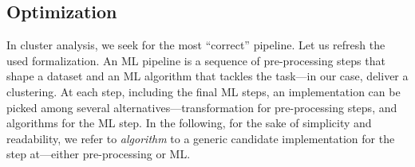 



%
%
\subsection{Optimization}
In cluster analysis, we seek for the most ``correct'' pipeline.
Let us refresh the used formalization.
An ML pipeline is a sequence of pre-processing steps that shape a dataset and an ML algorithm that tackles the task---in our case, deliver a clustering.
At each step, including the final ML steps, an implementation can be picked among several alternatives---transformation for pre-processing steps, and algorithms for the ML step.
In the following, for the sake of simplicity and readability, we refer to \textit{algorithm} to a generic candidate implementation for the step at---either pre-processing or ML.

